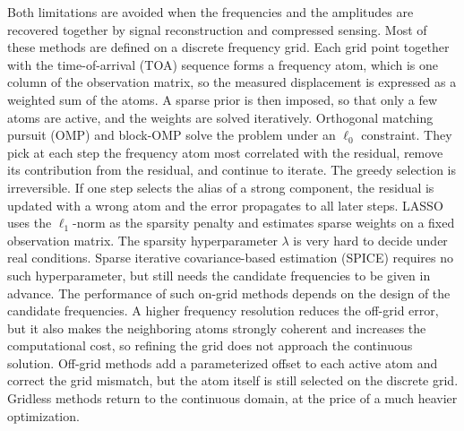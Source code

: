 \documentclass[journal,onecolumn]{IEEEtran}
\begin{document}
Both limitations are avoided when the frequencies and the amplitudes are recovered together by signal reconstruction and compressed sensing. Most of these methods are defined on a discrete frequency grid. Each grid point together with the time-of-arrival (TOA) sequence forms a frequency atom, which is one column of the observation matrix, so the measured displacement is expressed as a weighted sum of the atoms. A sparse prior is then imposed, so that only a few atoms are active, and the weights are solved iteratively. Orthogonal matching pursuit (OMP)\cite{Pati_Orthogonal_1993}\cite{Bouchain_Sparse_2018} and block-OMP\cite{Eldar_Block_2010}\cite{bouchain_blade_2019} solve the problem under an $\ell_0$ constraint. They pick at each step the frequency atom most correlated with the residual, remove its contribution from the residual, and continue to iterate. The greedy selection is irreversible. If one step selects the alias of a strong component, the residual is updated with a wrong atom and the error propagates to all later steps. LASSO\cite{tibshirani_regression_2011} uses the $\ell_1$-norm as the sparsity penalty and estimates sparse weights on a fixed observation matrix. The sparsity hyperparameter $\lambda$ is very hard to decide under real conditions. Sparse iterative covariance-based estimation (SPICE)\cite{zachariah_online_2015}\cite{kharyton_advanced_2021} requires no such hyperparameter, but still needs the candidate frequencies to be given in advance. The performance of such on-grid methods depends on the design of the candidate frequencies. A higher frequency resolution reduces the off-grid error, but it also makes the neighboring atoms strongly coherent and increases the computational cost, so refining the grid does not approach the continuous solution\cite{badiu_variational_2017}. Off-grid methods\cite{Yang_Off_2013}\cite{Mamandipoor_Newtonized_2016} add a parameterized offset to each active atom and correct the grid mismatch, but the atom itself is still selected on the discrete grid. Gridless methods\cite{Tang_Compressed_2013}\cite{Bhaskar_Atomic_2013} return to the continuous domain, at the price of a much heavier optimization\cite{jin_deep_2026}. 
\end{document}
